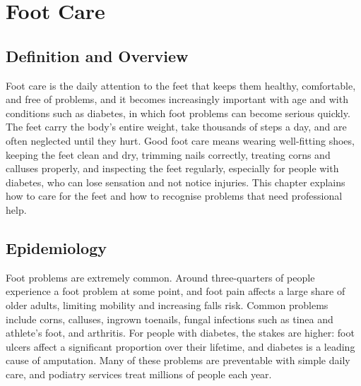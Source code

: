 \chapter{Foot Care}

\section*{Definition and Overview}
Foot care is the daily attention to the feet that keeps them healthy, comfortable, and free of problems, and it becomes increasingly important with age and with conditions such as diabetes, in which foot problems can become serious quickly. The feet carry the body's entire weight, take thousands of steps a day, and are often neglected until they hurt. Good foot care means wearing well-fitting shoes, keeping the feet clean and dry, trimming nails correctly, treating corns and calluses properly, and inspecting the feet regularly, especially for people with diabetes, who can lose sensation and not notice injuries. This chapter explains how to care for the feet and how to recognise problems that need professional help.

\section*{Epidemiology}
Foot problems are extremely common. Around three-quarters of people experience a foot problem at some point, and foot pain affects a large share of older adults, limiting mobility and increasing falls risk. Common problems include corns, calluses, ingrown toenails, fungal infections such as tinea and athlete's foot, and arthritis. For people with diabetes, the stakes are higher: foot ulcers affect a significant proportion over their lifetime, and diabetes is a leading cause of amputation. Many of these problems are preventable with simple daily care, and podiatry services treat millions of people each year.

